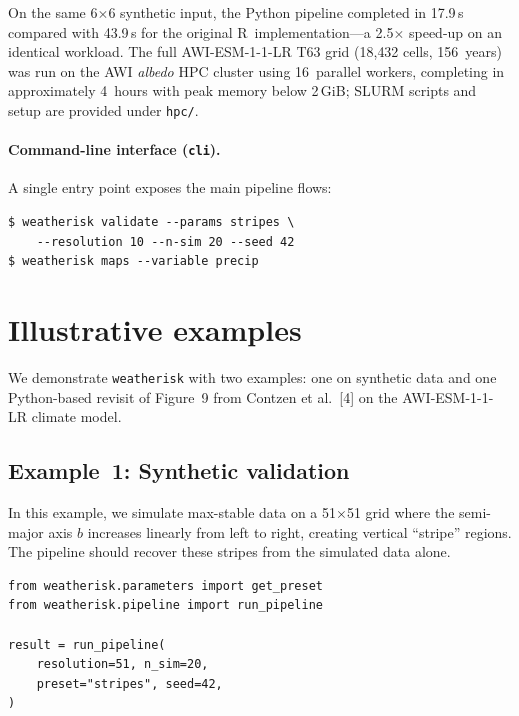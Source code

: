 \documentclass[preprint,12pt,a4paper]{elsarticle}
\newcommand{\rev}[1]{{#1}}
\newcommand{\revb}[1]{{#1}}
\begin{document}
On the same 6$\times$6 synthetic input, the Python pipeline
completed in 17.9\,s compared with 43.9\,s for the original
R~implementation---a 2.5$\times$ speed-up on an identical workload.
The full AWI-ESM-1-1-LR T63 grid (18{,}432 cells, 156~years) was
run on the AWI \emph{albedo} HPC cluster using 16~parallel workers,
completing in approximately 4~hours with peak memory below 2\,GiB;
SLURM scripts and setup are provided under \texttt{hpc/}.

\paragraph{Command-line interface (\texttt{cli}).}
A single entry point exposes the main pipeline flows:
\begin{lstlisting}[numbers=none]
$ weatherisk validate --params stripes \
    --resolution 10 --n-sim 20 --seed 42
$ weatherisk maps --variable precip
\end{lstlisting}

\section{Illustrative examples}
\label{sec:examples}

We demonstrate \texttt{weatherisk} with \rev{two} examples: one on
synthetic data \rev{and one \revb{Python-based revisit of Figure~9 from Contzen}
et al.~[4] on the AWI-ESM-1-1-LR climate model}.

\subsection{Example~1: Synthetic validation}
\label{sec:ex-synthetic}

In this example, we simulate max-stable data on a 51$\times$51 grid
where the semi-major axis $b$ increases linearly from left to right,
creating vertical ``stripe'' regions.  The pipeline should recover
these stripes from the simulated data alone.

\begin{lstlisting}[caption={Running the stripes validation.},
  label=lst:validate]
from weatherisk.parameters import get_preset
from weatherisk.pipeline import run_pipeline

result = run_pipeline(
    resolution=51, n_sim=20,
    preset="stripes", seed=42,
)
\end{lstlisting}
\end{document}
